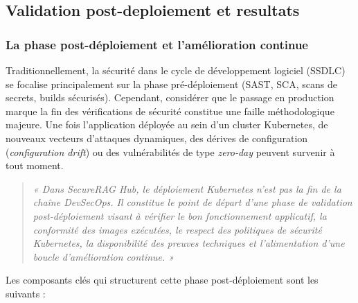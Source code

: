 \subsection{Validation post-deploiement et resultats}
\label{sec:validation-postdeploy}

\subsubsection{La phase post-déploiement et l'amélioration continue}
\label{subsec:post-deployment-continuous-improvement}

Traditionnellement, la sécurité dans le cycle de développement logiciel (SSDLC) se focalise principalement sur la phase pré-déploiement (SAST, SCA, scans de secrets, builds sécurisés). Cependant, considérer que le passage en production marque la fin des vérifications de sécurité constitue une faille méthodologique majeure. Une fois l'application déployée au sein d'un cluster Kubernetes, de nouveaux vecteurs d'attaques dynamiques, des dérives de configuration (\textit{configuration drift}) ou des vulnérabilités de type \textit{zero-day} peuvent survenir à tout moment.

\begin{quote}
  \textit{« Dans SecureRAG Hub, le déploiement Kubernetes n'est pas la fin de la chaîne DevSecOps. Il constitue le point de départ d'une phase de validation post-déploiement visant à vérifier le bon fonctionnement applicatif, la conformité des images exécutées, le respect des politiques de sécurité Kubernetes, la disponibilité des preuves techniques et l'alimentation d'une boucle d'amélioration continue. »}
\end{quote}

Les composants clés qui structurent cette phase post-déploiement sont les suivants :

